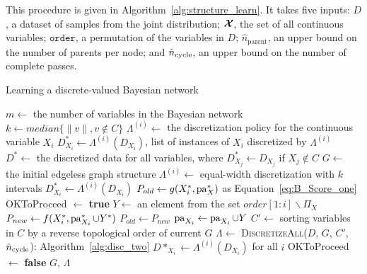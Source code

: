 This procedure is given in Algorithm~\ref{alg:structure_learn}.
It takes five inputs: $D$, a dataset of samples from the joint distribution; $\bm{\mathcal{X}}$, the set of all continuous variables; $\texttt{order}$, a permutation of the variables in $D$; $\hat{n}_\text{parent}$, an upper bound on the number of parents per node; and $\hat{n}_\text{cycle}$, an upper bound on the number of complete passes.

\begin{algorithm}
  \caption{Learning a discrete-valued Bayesian network}
  \label{alg:structure_learn}
  \begin{algorithmic}[5]
    \State $m \leftarrow$ the number of variables in the Bayesian network
    \State $k \leftarrow median\{ \|v\|, v\notin C\}$
    \State $\Lambda^{(i)} \leftarrow$ the discretization policy for the continuous variable $X_i$
    \State $D^*_{X_i} \leftarrow \Lambda^{(i)} (D_{X_i})$, list of instances of $X_i$ discretized by $\Lambda^{(i)}$
    \State $D^* \leftarrow $ the discretized data for all variables, where $D^*_{X_j} \leftarrow D_{X_j}$ if $X_j \notin C$
    \State $G \leftarrow$ the initial edgeless graph structure
        \State $\Lambda^{(i)} \leftarrow$ equal-width discretization with $k$ intervals
        \State $D^*_{X_i} \leftarrow  \Lambda^{(i)} (D_{X_i})$
      \EndIf
    \EndFor
      \State $P_{old} \leftarrow g(X^*_i,\operatorname{pa}^*_X)$ as Equation~\ref{eq:B_Score_one}
      \State OKToProceed $\leftarrow$ \textbf{true}
        \State $Y \leftarrow$ an element from the set $order[1:i] \backslash \Pi_X$
        \State $P_{new} \leftarrow f(X^*_i,\operatorname{pa}^*_{X_i} \cup Y^*)$
          \State $P_{old} \leftarrow P_{new}$
          \State $\operatorname{pa}_{X_i} \leftarrow \operatorname{pa}_{X_i} \cup Y $
          \State $C' \leftarrow$ sorting variables in $C$ by a reverse topological order of current $G$
          \State $\Lambda \leftarrow$ \textsc{DiscretizeAll}({$D$, $G$, $C'$, $\hat{n}_\text{cycle}$}): Algorithm~\ref{alg:disc_two}
          \State $D*_{X_i} \leftarrow \Lambda^{(i)}(D_{X_i})$ for all $i$
        \Else
          \State OKToProceed $\leftarrow$ \textbf{false}
        \EndIf
      \EndWhile
    \EndFor
    \State \Return $G$, $\Lambda$
  \EndFunction
  \end{algorithmic}
\end{algorithm}

